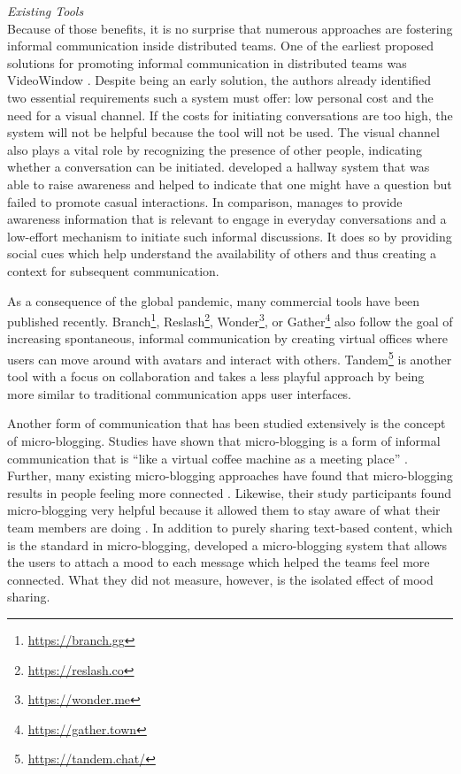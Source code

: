 \medskip\noindent\textit{Existing Tools} \\
Because of those benefits, it is no surprise that numerous approaches are fostering informal communication inside distributed teams. One of the earliest proposed solutions for promoting informal communication in distributed teams was VideoWindow \autocite{fish1990videowindow}. Despite being an early solution, the authors already identified two essential requirements such a system must offer: low personal cost and the need for a visual channel. If the costs for initiating conversations are too high, the system will not be helpful because the tool will not be used. The visual channel also plays a vital role by recognizing the presence of other people, indicating whether a conversation can be initiated. \textcite{sasaki1999video} developed a hallway system that was able to raise awareness and helped to indicate that one might have a question but failed to promote casual interactions. In comparison, \textcite{lou2012presencescape} manages to provide awareness information that is relevant to engage in everyday conversations and a low-effort mechanism to initiate such informal discussions. It does so by providing social cues which help understand the availability of others and thus creating a context for subsequent communication.

As a consequence of the global pandemic, many commercial tools have been published recently. Branch\footnote{\url{https://branch.gg}}, Reslash\footnote{\url{https://reslash.co}}, Wonder\footnote{\url{https://wonder.me}}, or Gather\footnote{\url{https://gather.town}} also follow the goal of increasing spontaneous, informal communication by creating virtual offices where users can move around with avatars and interact with others. Tandem\footnote{\url{https://tandem.chat/}} is another tool with a focus on collaboration and takes a less playful approach by being more similar to traditional communication apps user interfaces.

Another form of communication that has been studied extensively is the concept of micro-blogging. Studies have shown that micro-blogging is a form of informal communication \autocite{ehrlich2010microblogging} that is \enquote{like a virtual coffee machine as a meeting place} \autocite[p.~158]{ebner2008microblogging}. Further, many existing micro-blogging approaches have found that micro-blogging results in people feeling more connected \autocite{ehrlich2010microblogging, zhang2010case}. Likewise, their study participants found micro-blogging very helpful because it allowed them to stay aware of what their team members are doing \autocite{zhang2010case}. In addition to purely sharing text-based content, which is the standard in micro-blogging, \textcite{dullemond2013fixing} developed a micro-blogging system that allows the users to attach a mood to each message which helped the teams feel more connected. What they did not measure, however, is the isolated effect of mood sharing.

